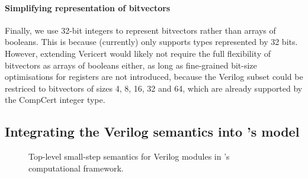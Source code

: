 \paragraph{Simplifying representation of bitvectors} Finally, we use 32-bit
integers to represent bitvectors rather than arrays of booleans. This is because
\vericert{} (currently) only supports types represented by 32 bits.  However,
extending Vericert would likely not require the full flexibility of bitvectors
as arrays of booleans either, as long as fine-grained bit-size optimisations for
registers are not introduced, because the Verilog subset could be restriced to
bitvectors of sizes 4, 8, 16, 32 and 64, which are already supported by the
CompCert integer type.

\subsection{Integrating the Verilog semantics into \compcert{}'s model}
\label{sec:verilog:integrating}

\begin{figure*}
  \centering
  \begin{minipage}{1.0\linewidth}
  \end{minipage}
  \caption{Top-level small-step semantics for Verilog modules in \compcert{}'s computational framework.}%
  \label{fig:inference_module}
\end{figure*}

